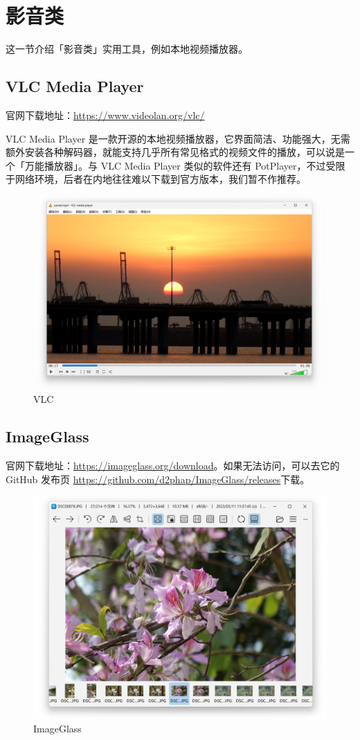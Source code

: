 \section{影音类}

这一节介绍「影音类」实用工具，例如本地视频播放器。

\subsection{VLC Media Player}

官网下载地址：\url{https://www.videolan.org/vlc/}

VLC Media Player 是一款开源的本地视频播放器，它界面简洁、功能强大，无需额外安装各种解码器，就能支持几乎所有常见格式的视频文件的播放，可以说是一个「万能播放器」。与 VLC Media Player 类似的软件还有 PotPlayer，不过受限于网络环境，后者在内地往往难以下载到官方版本，我们暂不作推荐。

\begin{figure}[htb!]
  \centering
  \includegraphics[width=.65\textwidth]{assets/software/VLC.png}
  \caption{VLC}
  \label{fig:VLC}
\end{figure}
\vspace*{-1cm}

\subsection{ImageGlass}

官网下载地址：\url{https://imageglass.org/download}。如果无法访问，可以去它的 GitHub 发布页 \url{https://github.com/d2phap/ImageGlass/releases}下载。

\begin{figure}[htb!]
  \centering
  \includegraphics[width=.6\textwidth]{assets/software/ImageGlass.png}
  \caption{ImageGlass}
  \label{fig:ImageGlass}
\end{figure}

